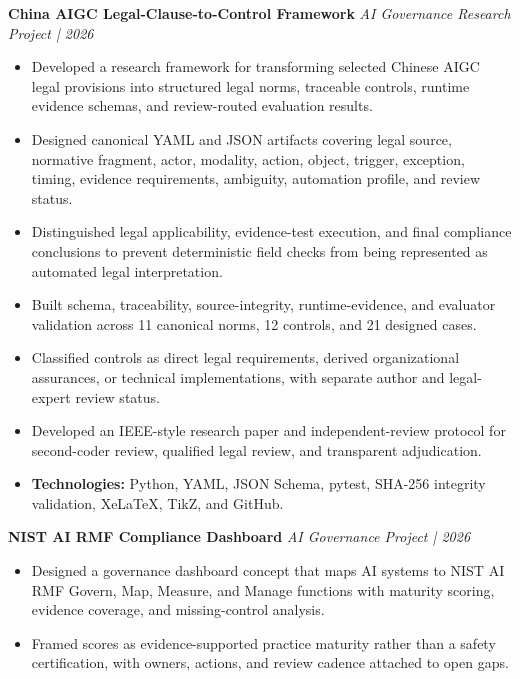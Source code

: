 \documentclass[10pt]{article}
\newcommand{\project}[2]{%
  \textbf{#1} \hfill \textit{#2}\\[-3pt]
}
\begin{document}
\project{China AIGC Legal-Clause-to-Control Framework}{AI Governance Research Project | 2026}
\begin{itemize}
  \item Developed a research framework for transforming selected Chinese AIGC legal provisions into structured legal norms, traceable controls, runtime evidence schemas, and review-routed evaluation results.
  \item Designed canonical YAML and JSON artifacts covering legal source, normative fragment, actor, modality, action, object, trigger, exception, timing, evidence requirements, ambiguity, automation profile, and review status.
  \item Distinguished legal applicability, evidence-test execution, and final compliance conclusions to prevent deterministic field checks from being represented as automated legal interpretation.
  \item Built schema, traceability, source-integrity, runtime-evidence, and evaluator validation across 11 canonical norms, 12 controls, and 21 designed cases.
  \item Classified controls as direct legal requirements, derived organizational assurances, or technical implementations, with separate author and legal-expert review status.
  \item Developed an IEEE-style research paper and independent-review protocol for second-coder review, qualified legal review, and transparent adjudication.
  \item \textbf{Technologies:} Python, YAML, JSON Schema, pytest, SHA-256 integrity validation, XeLaTeX, TikZ, and GitHub.
\end{itemize}

\project{NIST AI RMF Compliance Dashboard}{AI Governance Project | 2026}
\begin{itemize}
  \item Designed a governance dashboard concept that maps AI systems to NIST AI RMF Govern, Map, Measure, and Manage functions with maturity scoring, evidence coverage, and missing-control analysis.
  \item Framed scores as evidence-supported practice maturity rather than a safety certification, with owners, actions, and review cadence attached to open gaps.
\end{itemize}
\end{document}
